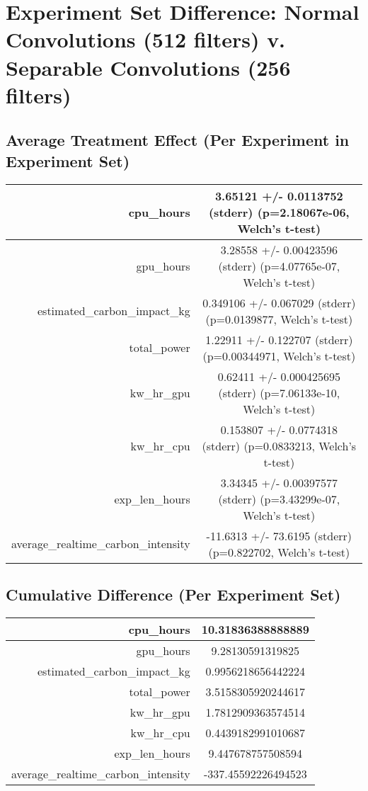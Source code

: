 \documentclass{article}%
\begin{document}
%
\normalsize%
\section{Experiment Set Difference: Normal Convolutions (512 filters) v. Separable Convolutions (256 filters)}%
\label{sec:Experiment Set Difference Normal Convolutions (512 filters) v. Separable Convolutions (256 filters)}%
\subsection{Average Treatment Effect (Per Experiment in Experiment Set)}%
\label{subsec:Average Treatment Effect (Per Experiment in Experiment Set)}%
\begin{tabular}{|r|c|}%
\hline%
cpu\_hours&3.65121 +/{-} 0.0113752 (stderr) (p=2.18067e{-}06, Welch's t{-}test)\\%
\hline%
gpu\_hours&3.28558 +/{-} 0.00423596 (stderr) (p=4.07765e{-}07, Welch's t{-}test)\\%
\hline%
estimated\_carbon\_impact\_kg&0.349106 +/{-} 0.067029 (stderr) (p=0.0139877, Welch's t{-}test)\\%
\hline%
total\_power&1.22911 +/{-} 0.122707 (stderr) (p=0.00344971, Welch's t{-}test)\\%
\hline%
kw\_hr\_gpu&0.62411 +/{-} 0.000425695 (stderr) (p=7.06133e{-}10, Welch's t{-}test)\\%
\hline%
kw\_hr\_cpu&0.153807 +/{-} 0.0774318 (stderr) (p=0.0833213, Welch's t{-}test)\\%
\hline%
exp\_len\_hours&3.34345 +/{-} 0.00397577 (stderr) (p=3.43299e{-}07, Welch's t{-}test)\\%
\hline%
average\_realtime\_carbon\_intensity&{-}11.6313 +/{-} 73.6195 (stderr) (p=0.822702, Welch's t{-}test)\\%
\hline%
\end{tabular}

%
\subsection{Cumulative Difference (Per Experiment Set)}%
\label{subsec:Cumulative Difference (Per Experiment Set)}%
\begin{tabular}{|r|c|}%
\hline%
cpu\_hours&10.31836388888889\\%
\hline%
gpu\_hours&9.28130591319825\\%
\hline%
estimated\_carbon\_impact\_kg&0.9956218656442224\\%
\hline%
total\_power&3.5158305920244617\\%
\hline%
kw\_hr\_gpu&1.7812909363574514\\%
\hline%
kw\_hr\_cpu&0.4439182991010687\\%
\hline%
exp\_len\_hours&9.447678757508594\\%
\hline%
average\_realtime\_carbon\_intensity&{-}337.45592226494523\\%
\hline%
\end{tabular}

%
\end{document}
